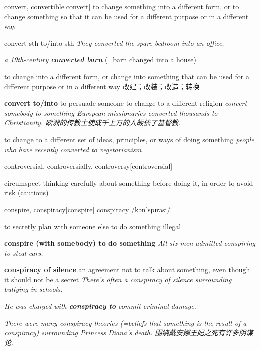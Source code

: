 \begin{DefWord}{convert, convertible}[convert]
    to change something into a different form, or to change something so that it can be used for a different purpose or in a different way

    convert sth to/into sth
    \textit{They converted the spare bedroom into an office.}

    \textit{a 19th-century \textbf{converted barn}} (=barn changed into a house)

    to change into a different form, or change into something that can be used for a different purpose or in a different way 改建；改装；改造；转换

    \textbf{convert to/into}
    to persuade someone to change to a different religion
    \textit{convert somebody to something
    European missionaries converted thousands to Christianity. 欧洲的传教士使成千上万的人皈依了基督教. }

    to change to a different set of ideas, principles, or ways of doing something
    \textit{people who have recently converted to vegetarianism}
\end{DefWord}

\begin{DefWord}{controversial, controversially, controversy}[controversial]
\end{DefWord}

\begin{DefWord}{circumspect}
    thinking carefully about something before doing it, in order to avoid risk (cautious)
\end{DefWord}

\begin{DefWord}{conspire, conspiracy}[conspire]
    conspiracy /kənˈspɪrəsi/

    to secretly plan with someone else to do something illegal

    \textbf{conspire (with somebody) to do something}
    \textit{All six men admitted conspiring to steal cars.}

    \textbf{conspiracy of silence} an agreement not to talk about something, even though it should not be a secret
    \textit{There's often a conspiracy of silence surrounding bullying in schools.}

    \textit{He was charged with \textbf{conspiracy to} commit criminal damage.}

    \textit{There were many conspiracy theories (=beliefs that something is the result of a conspiracy) surrounding Princess Diana's death. 围绕戴安娜王妃之死有许多阴谋论. }
\end{DefWord}

